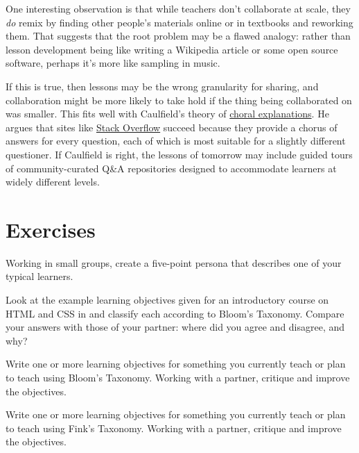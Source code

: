 One interesting observation is that while teachers don't collaborate
at scale, they \emph{do} remix by finding other people's materials
online or in textbooks and reworking them. That suggests that the root
problem may be a flawed analogy: rather than lesson development being
like writing a Wikipedia article or some open source software, perhaps
it's more like sampling in music.

If this is true, then lessons may be the wrong granularity for
sharing, and collaboration might be more likely to take hold if the
thing being collaborated on was smaller. This fits well with
Caulfield's theory of
\href{https://hapgood.us/2016/05/13/choral-explanations/}{choral
  explanations}.  He argues that sites like
\href{https://stackoverflow.com/}{Stack Overflow} succeed because they
provide a chorus of answers for every question, each of which is most
suitable for a slightly different questioner. If Caulfield is right,
the lessons of tomorrow may include guided tours of community-curated
Q\&A repositories designed to accommodate learners at widely different
levels.

\section{Exercises}\label{s:process-exercises}


Working in small groups, create a five-point persona that describes
one of your typical learners.


Look at the example learning objectives given for an introductory
course on HTML and CSS in  and classify
each according to Bloom's Taxonomy.  Compare your answers with those
of your partner: where did you agree and disagree, and why?


Write one or more learning objectives for something you currently
teach or plan to teach using Bloom's Taxonomy. Working with a partner,
critique and improve the objectives.


Write one or more learning objectives for something you currently
teach or plan to teach using Fink's Taxonomy. Working with a partner,
critique and improve the objectives.

